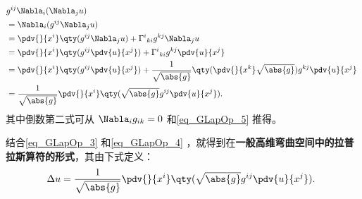 \begin{equation}\label{eq_GLapOp_4}
\begin{aligned}
&g^{ij}\Nabla_i(\Nabla_j u)\\
&=\Nabla_i(g^{ij}\Nabla_j u)\\
&=\pdv{}{x^i}\qty(g^{ij}\Nabla_j u)+{\Gamma^{i}}_{ki}g^{kj}\Nabla_j u\\
&=\pdv{}{x^i}\qty(g^{ij}\pdv{u}{x^j})+{\Gamma^{i}}_{ki}g^{kj}\pdv{u}{x^j}\\
&=\pdv{}{x^i}\qty(g^{ij}\pdv{u}{x^j})+\frac{1}{\sqrt{\abs{g}}}\qty(\pdv{}{x^k}\sqrt{\abs{g}})g^{kj}\pdv{u}{x^j}\\
&=\frac{1}{\sqrt{\abs{g}}}\pdv{}{x^i}\qty(\sqrt{\abs{g}}g^{ij}\pdv{u}{x^j}).
\end{aligned}~
\end{equation}
其中倒数第二式可从 $\Nabla_i g_{ik}=0$ 和\autoref{eq_GLapOp_5} 推得。

结合\autoref{eq_GLapOp_3} 和\autoref{eq_GLapOp_4} ，就得到在\textbf{一般高维弯曲空间中的拉普拉斯算符的形式}，其由下式定义：
\begin{equation}
\Delta u=\frac{1}{\sqrt{\abs{g}}}\pdv{}{x^i}\qty(\sqrt{\abs{g}}g^{ij}\pdv{u}{x^j}).~
\end{equation}






